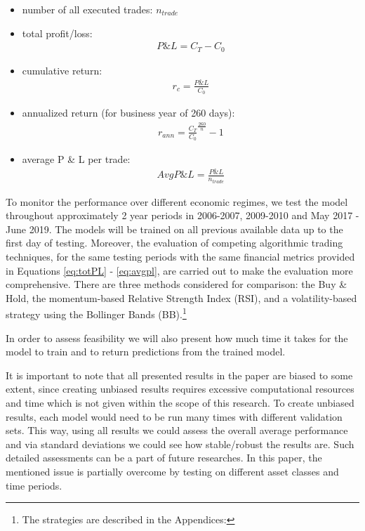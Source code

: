 \documentclass[11pt, a4paper]{article}
\begin{document}
\begin{itemize}
    \item number of all executed trades: $n_{trade}$
    \item total profit/loss: 
    \begin{align}
        \label{eq:totPL}
            P\& L = C_T - C_0
    \end{align}
    \item cumulative return: 
    \begin{align}
        \label{eq:cumret}
            r_c = \frac{P \& L}{C_0}
    \end{align}
    \item annualized return (for business year of 260 days): 
    \begin{align}
        \label{eq:annualized}
            r_{ann} = \frac{C_T}{C_0}^{\frac{260}{n}}-1
    \end{align}
    \item average P \& L per trade:
    \begin{align}
        \label{eq:avgpl}
        AvgP \& L = \frac{P \& L}{n_{trade}}
    \end{align}
\end{itemize}

To monitor the performance over different economic regimes, we test the model throughout approximately 2 year periods in 2006-2007, 2009-2010 and May 2017 - June 2019. The models will be trained on all previous available data up to the first day of testing. 
Moreover, the evaluation of competing algorithmic trading techniques, for the same testing periods with the same financial metrics provided in Equations \ref{eq:totPL} - \ref{eq:avgpl}, are carried out to make the evaluation more comprehensive.
There are three methods considered for comparison: the Buy \& Hold, the momentum-based Relative Strength Index (RSI), and a volatility-based strategy using the Bollinger Bands (BB).\footnote{The strategies are described in the Appendices: }

In order to assess feasibility we will also present how much time it takes for the model to train and to return predictions from the trained model.

It is important to note that all presented results in the paper are biased to some extent, since creating unbiased results requires excessive computational resources and time which is not given within the scope of this research. To create unbiased results, each model would need to be run many times with different validation sets. This way, using all results we could assess the overall average performance and via standard deviations we could see how stable/robust the results are. Such detailed assessments can be a part of future researches. In this paper, the mentioned issue is partially overcome by testing on different asset classes and time periods.
\end{document}
